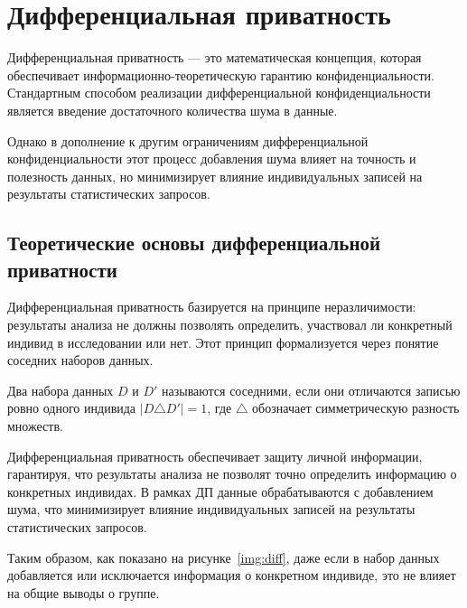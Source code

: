 \section{Дифференциальная приватность}

Дифференциальная приватность --- это математическая концепция, которая обеспечивает информационно-теоретическую гарантию конфиденциальности.
Стандартным способом реализации дифференциальной конфиденциальности является введение достаточного количества шума в данные.

Однако в дополнение к другим ограничениям дифференциальной конфиденциальности этот процесс добавления шума влияет на точность и полезность данных, но минимизирует влияние индивидуальных записей на результаты статистических запросов.~\cite{dp}

\subsection{Теоретические основы дифференциальной приватности}

Дифференциальная приватность базируется на принципе неразличимости: результаты анализа не должны позволять определить, участвовал ли конкретный индивид в исследовании или нет. Этот принцип формализуется через понятие соседних наборов данных.

Два набора данных $D$ и $D'$ называются соседними, если они отличаются записью ровно одного индивида $|D \triangle D'| = 1$, где $\triangle$ обозначает симметрическую разность множеств.

Дифференциальная приватность обеспечивает защиту личной информации, гарантируя, что результаты анализа не позволят точно определить информацию о конкретных индивидах. 
В рамках ДП данные обрабатываются с добавлением шума, что минимизирует влияние индивидуальных записей на результаты статистических запросов.

Таким образом, как показано на рисунке~\ref{img:diff}, даже если в набор данных добавляется или исключается информация о конкретном индивиде, это не влияет на общие выводы о группе.~\cite{Wood2018DifferentialPA}


